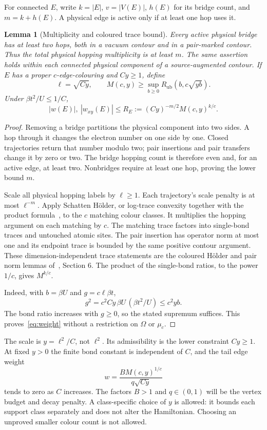 \documentclass[11pt]{article}
\theoremstyle{plain}
\newtheorem{lemma}{Lemma}
\theoremstyle{remark}
\begin{document}
For connected $E$, write $k=|E|$, $v=|V(E)|$, $h(E)$ for its bridge count,
and $m=k+h(E)$. A physical edge is active only if at least one hop uses it.

\begin{lemma}[Multiplicity and coloured trace bound]\label{lem:weight}
Every active physical bridge has at least two hops, both in a vacuum contour
and in a pair-marked contour. Thus the total physical hopping multiplicity is
at least $m$. The same assertion holds within each connected physical
component of a source-augmented contour.
If $E$ has a proper $c$-edge-colouring and $Cy\ge1$, define
\[
\ell=\sqrt{Cy},\qquad
M(c,y)\ge\sup_{b\ge0}R_{\mathrm{ub}}(b,c\sqrt{yb}).
\]
Under $\beta t^2/U\le1/C$,
\begin{equation}\label{eq:weight}
|w(E)|,\ |w_{xy}(E)|\le
R_E:=(Cy)^{-m/2}M(c,y)^{k/c}.
\end{equation}
\end{lemma}
\begin{proof}
Removing a bridge partitions the physical component into two sides.
A hop through it changes the electron number on one side by one.
Closed trajectories return that number modulo two; pair insertions and pair
transfers change it by zero or two. The bridge hopping count is therefore
even and, for an active edge, at least two. Nonbridges require at least one
hop, proving the lower bound $m$.

Scale all physical hopping labels by $\ell\ge1$. Each trajectory's scale
penalty is at most $\ell^{-m}$. Apply Schatten H\"older, or log-trace
convexity together with the product formula~\cite{trotter1959}, to the $c$
matching colour classes. It multiplies the hopping argument on each matching
by $c$. The matching trace factors into single-bond traces and untouched
atomic sites. The pair insertion has operator norm at most one and its
endpoint trace is bounded by the same positive contour argument.
These dimension-independent trace statements are the coloured H\"older and
pair norm lemmas of~\cite{rensSharp}, Section 6. The product of the single-bond
ratios, to the power $1/c$, gives $M^{k/c}$.

Indeed, with $b=\beta U$ and $g=c\ell\beta t$,
\[
g^2=c^2Cy\,\beta U\,(\beta t^2/U)\le c^2yb.
\]
The bond ratio increases with $g\ge0$, so the stated supremum suffices.
This proves~\eqref{eq:weight} without a restriction on $\Omega$ or $\mu_c$.
\end{proof}

The scale is $y=\ell^2/C$, not $\ell^2$. Its admissibility is the lower
constraint $Cy\ge1$. At fixed $y>0$ the finite bond constant is independent
of $C$, and the tail edge weight
\begin{equation}\label{eq:tailweight}
w=\frac{B M(c,y)^{1/c}}{q\sqrt{Cy}}
\end{equation}
tends to zero as $C$ increases. The factors $B>1$ and $q\in(0,1)$ will be
the vertex budget and decay penalty. A class-specific choice of $y$ is
allowed: it bounds each support class separately and does not alter the
Hamiltonian. Choosing an unproved smaller colour count is not allowed.
\end{document}
